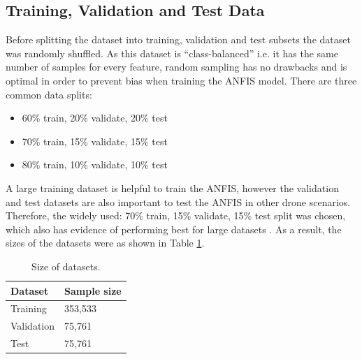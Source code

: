 \subsection{Training, Validation and Test Data}
Before splitting the dataset into training, validation and test subsets the dataset was randomly shuffled. As this dataset is ``class-balanced'' i.e. it has the same number of samples for every feature, random sampling has no drawbacks and is optimal in order to prevent bias when training the ANFIS model. 
There are three common data splits:
\begin{itemize}
    \item 60\% train, 20\% validate, 20\% test
    \item 70\% train, 15\% validate, 15\% test
    \item 80\% train, 10\% validate, 10\% test
\end{itemize}
A large training dataset is helpful to train the ANFIS, however the validation and test datasets are also important to test the ANFIS in other drone scenarios. Therefore, the widely used: 70\% train, 15\% validate, 15\% test split was chosen, which also has evidence of performing best for large datasets \cite{zain1}. As a result, the sizes of the datasets were as shown in Table \ref{tab:zain1}.
\begin{table}[H]
    \centering
    \begin{tabular}{@{}ll@{}}
        \toprule
        \textbf{Dataset} & \textbf{Sample size} \\
        \midrule
        Training & 353,533\\
        Validation & 75,761\\
        Test & 75,761\\
        \bottomrule
    \end{tabular}
    \caption{Size of datasets.}
    \label{tab:zain1}
\end{table}
